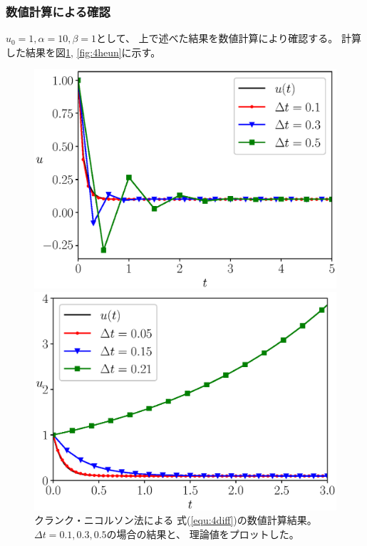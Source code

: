 \documentclass[a4j, titlepage]{jsarticle}
\numberwithin{equation}{section}
\begin{document}
        \subsubsection{数値計算による確認} \label{sec:4calc}
            $u_0 = 1, \alpha = 10, \beta = 1$として、
            上で述べた結果を数値計算により確認する。
            計算した結果を図\ref{fig:4crank}, \ref{fig:4heun}に示す。
            \begin{figure}[h]
                \begin{minipage}{0.49\hsize}
                    \centering
                    \includegraphics[width=1\hsize]{kadai4/crank.eps}
                    \caption{
                        クランク・ニコルソン法による
                        式(\ref{equ:4diff})の数値計算結果。
                        $\Delta t = 0.1, 0.3, 0.5$の場合の結果と、
                        理論値をプロットした。
                    }
                    \label{fig:4crank}
                \end{minipage}
                \begin{minipage}{0.49\hsize}
                    \centering
                    \includegraphics[width=1\hsize]{kadai4/heun.eps}

\end{minipage}
\end{figure}
\end{document}
